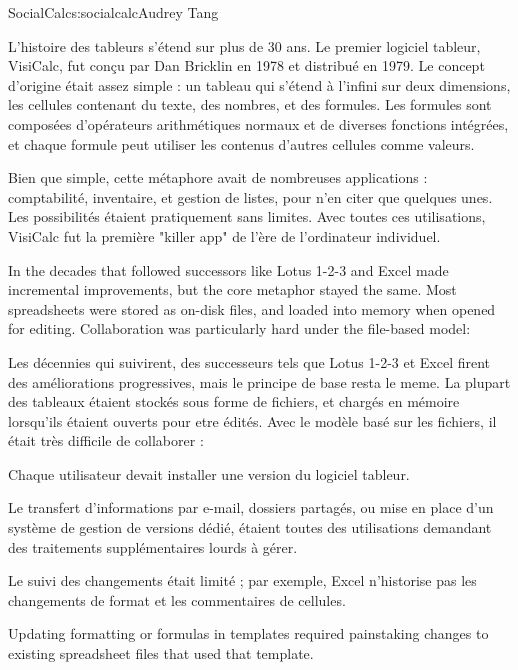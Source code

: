 \begin{aosachapter}{SocialCalc}{s:socialcalc}{Audrey Tang}

L'histoire des tableurs s'étend sur plus de 30 ans.  Le premier logiciel tableur, VisiCalc, fut conçu par Dan Bricklin en 1978 et distribué en 1979.  Le concept d'origine était assez simple : un tableau qui s'étend à l'infini sur deux dimensions, les cellules contenant du texte, des nombres, et des formules.  Les formules sont composées d'opérateurs arithmétiques normaux et de diverses fonctions intégrées, et chaque formule peut utiliser les contenus d'autres cellules comme valeurs.

Bien que simple, cette métaphore avait de nombreuses applications : comptabilité, inventaire, et gestion de listes, pour n'en citer que quelques unes.  Les possibilités étaient pratiquement sans limites.  Avec toutes ces utilisations, VisiCalc fut la première "killer app" de l'ère de l'ordinateur individuel. 

In the decades that followed successors like Lotus 1-2-3 and Excel
made incremental improvements, but the core metaphor stayed the same.
Most spreadsheets were stored as on-disk files, and loaded into memory
when opened for editing.  Collaboration was particularly hard under
the file-based model:

Les décennies qui suivirent, des successeurs tels que Lotus 1-2-3 et Excel firent des améliorations progressives, mais le principe de base resta le meme. La plupart des tableaux étaient stockés sous forme de fichiers, et chargés en mémoire lorsqu'ils étaient ouverts pour etre édités.  Avec le modèle basé sur les fichiers, il était très difficile de collaborer  :

\begin{aosaitemize}

  \item Chaque utilisateur devait installer une version du logiciel tableur.

  \item Le transfert d'informations par e-mail, dossiers partagés, ou mise en place d'un système de gestion de versions dédié, étaient toutes des utilisations demandant des traitements supplémentaires lourds à gérer.

  \item Le suivi des changements était limité ; par exemple, Excel n'historise pas les changements de format et les commentaires de cellules.

  \item Updating formatting or formulas in templates required painstaking changes to existing spreadsheet files that used that template.


\end{aosaitemize}
\end{aosachapter}
